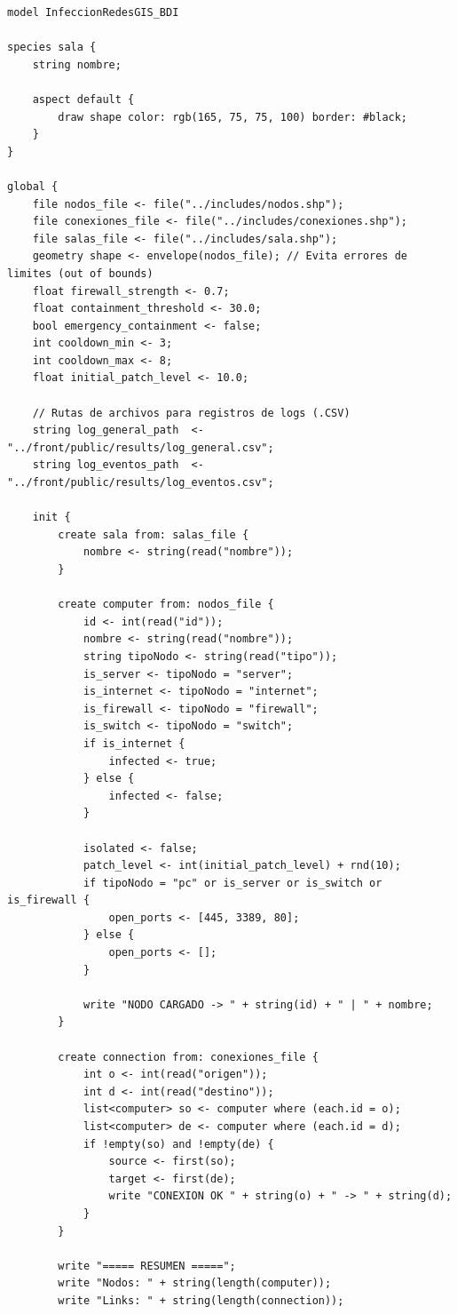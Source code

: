 \documentclass{ieeeaccess}
\begin{document}
\begin{lstlisting}[caption={InfeccionRedes.gaml - Código fuente de la simulación en GAMA Platform}, label={list:gaml_code}]
model InfeccionRedesGIS_BDI

species sala {
	string nombre;

	aspect default {
		draw shape color: rgb(165, 75, 75, 100) border: #black;
	}
}

global {
	file nodos_file <- file("../includes/nodos.shp");
	file conexiones_file <- file("../includes/conexiones.shp");
	file salas_file <- file("../includes/sala.shp");
	geometry shape <- envelope(nodos_file); // Evita errores de limites (out of bounds)
	float firewall_strength <- 0.7;
	float containment_threshold <- 30.0;
	bool emergency_containment <- false;
	int cooldown_min <- 3;
	int cooldown_max <- 8;
	float initial_patch_level <- 10.0;

	// Rutas de archivos para registros de logs (.CSV)
	string log_general_path  <- "../front/public/results/log_general.csv";
	string log_eventos_path  <- "../front/public/results/log_eventos.csv";

	init {
		create sala from: salas_file {
			nombre <- string(read("nombre"));
		}

		create computer from: nodos_file {
			id <- int(read("id"));
			nombre <- string(read("nombre"));
			string tipoNodo <- string(read("tipo"));
			is_server <- tipoNodo = "server";
			is_internet <- tipoNodo = "internet";
			is_firewall <- tipoNodo = "firewall";
			is_switch <- tipoNodo = "switch";
			if is_internet {
				infected <- true;
			} else {
				infected <- false;
			}

			isolated <- false;
			patch_level <- int(initial_patch_level) + rnd(10);
			if tipoNodo = "pc" or is_server or is_switch or is_firewall {
				open_ports <- [445, 3389, 80];
			} else {
				open_ports <- [];
			}

			write "NODO CARGADO -> " + string(id) + " | " + nombre;
		}

		create connection from: conexiones_file {
			int o <- int(read("origen"));
			int d <- int(read("destino"));
			list<computer> so <- computer where (each.id = o);
			list<computer> de <- computer where (each.id = d);
			if !empty(so) and !empty(de) {
				source <- first(so);
				target <- first(de);
				write "CONEXION OK " + string(o) + " -> " + string(d);
			}
		}

		write "===== RESUMEN =====";
		write "Nodos: " + string(length(computer));
		write "Links: " + string(length(connection));


\end{lstlisting}
\end{document}
